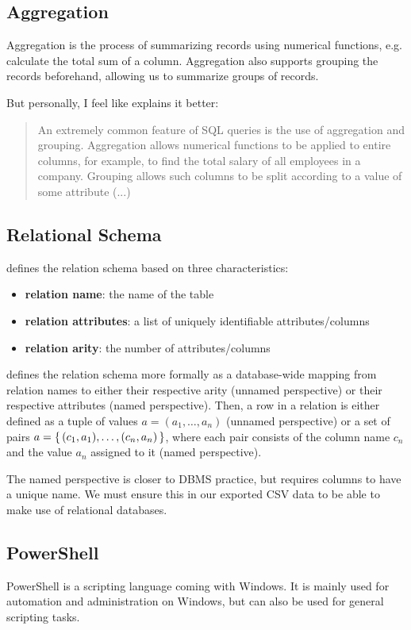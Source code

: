 \documentclass[12pt,letterpaper]{article} %
\begin{document}
\subsection{Aggregation}
Aggregation is the process of summarizing records using numerical functions, e.g.
calculate the total sum of a column. Aggregation also supports grouping the
records beforehand, allowing us to summarize groups of records.

But personally, I feel like \cite{Aren22} explains it better:
\begin{quote}
An extremely common feature of SQL queries
is the use of aggregation and grouping. Aggregation allows numerical functions to be
applied to entire columns, for example, to find the total salary
of all employees in a company. Grouping allows such columns to be split
according to a value of some attribute (...)
\end{quote}

\subsection{Relational Schema}
\cite{Aren22} defines the relation schema based on three characteristics:
\begin{itemize}
    \item \textbf{relation name}: the name of the table
    \item \textbf{relation attributes}: a list of uniquely identifiable attributes/columns
    \item \textbf{relation arity}: the number of attributes/columns
\end{itemize}
\cite{Schw10} defines the relation schema more formally as a database-wide mapping
from relation names to either their respective arity (unnamed perspective) or
their respective attributes (named perspective). Then, a row in a relation
is either defined as a tuple of values $a = (a_1,\dots, a_n)$ (unnamed perspective) or
a set of pairs $a = \set{(c_1, a_1),\dots, (c_n, a_n)}$, where each pair consists of
the column name $c_n$ and the value $a_n$ assigned to it (named perspective).

The named perspective is closer to DBMS practice, but requires columns to have a unique
name. We must ensure this in our exported CSV data to be able to make use of relational
databases.

\subsection{PowerShell}
PowerShell is a scripting language coming with Windows. It is mainly used for
automation and administration on Windows, but can also be used for general scripting tasks.
\end{document}
